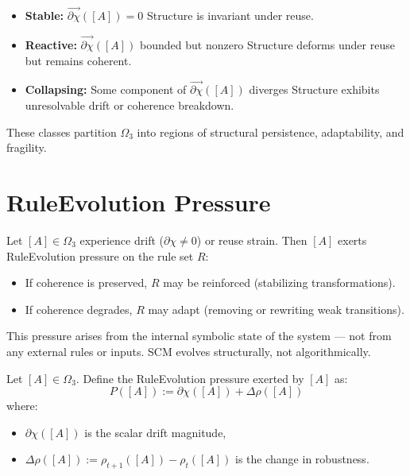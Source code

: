 \begin{itemize}
    \item \textbf{Stable:} $\vec{\partial \chi}([A]) = 0$
    Structure is invariant under reuse.

    \item \textbf{Reactive:} $\vec{\partial \chi}([A])$ bounded but nonzero
    Structure deforms under reuse but remains coherent.

    \item \textbf{Collapsing:} Some component of $\vec{\partial \chi}([A])$ diverges
    Structure exhibits unresolvable drift or coherence breakdown.
\end{itemize}

These classes partition $\Omega_3$ into regions of structural persistence, adaptability, and fragility.

\section{RuleEvolution Pressure} \label{ruleevolution-pressure}

Let $[A] \in \Omega_3$ experience drift ($\partial \chi \ne 0$) or reuse strain.  
Then $[A]$ exerts RuleEvolution pressure on the rule set $R$:

\begin{itemize}
  \item If coherence is preserved, $R$ may be reinforced (stabilizing transformations).
  \item If coherence degrades, $R$ may adapt (removing or rewriting weak transitions).
\end{itemize}

This pressure arises from the internal symbolic state of the system — not from any external rules or inputs.  
SCM evolves structurally, not algorithmically.

\begin{definition} \label{def:ruleevolution-pressure}
Let $[A] \in \Omega_3$. Define the RuleEvolution pressure exerted by $[A]$ as:
\[
P([A]) := \partial \chi([A]) + \Delta \rho([A])
\]
where:
\begin{itemize}
    \item $\partial \chi([A])$ is the scalar drift magnitude,
    \item $\Delta \rho([A]) := \rho_{t+1}([A]) - \rho_t([A])$ is the change in robustness.
\end{itemize}
\end{definition}

